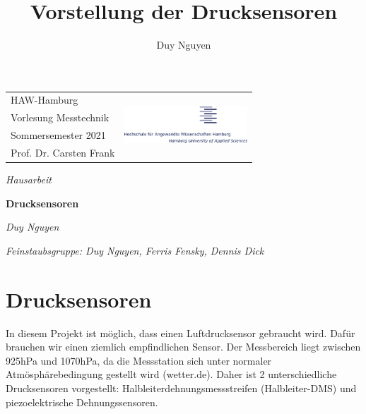 \documentclass[12pt]{article}
\title{Vorstellung der Drucksensoren}
\author{Duy Nguyen}
\begin{document}
\pagestyle{empty}
\color{smokyblack}

\setlength{\parskip}{1ex}
\begin{table}[t]
  \begin{center}
    \begin{tabular}{p{}r}
      \small{HAW-Hamburg} & \multirow{4}{*}{\includegraphics[width=4.6cm]{haw-logo}} \\
      \small{Vorlesung Messtechnik} &  \\
      \small{Sommersemester 2021} & \\
      \small{Prof. Dr. Carsten Frank} & 
    \end{tabular} 
  \end{center}
\end{table}

\vspace{2cm}

\textsf{\textit{\Large{Hausarbeit}}}

\color{arsenic}
\textsf{\textbf{\huge{Drucksensoren}}}
\setlength{\parskip}{0.8em}
\color{smokyblack}

\begin{adjustwidth}{3em}{0pt}
\begin{flushleft}
	\textit{Duy Nguyen} 

  \vspace{-12pt}

  \textit{\footnotesize{Feinstaubsgruppe: Duy Nguyen, Ferris Fensky, Dennis Dick}}
\end{flushleft}
\end{adjustwidth}

\tableofcontents
\newpage
\listoffigures
{}
\listoftables
{}


\newpage
\pagestyle{fancy}
\section{Drucksensoren}
\label{sec:drucksensoren}
In diesem Projekt ist möglich, dass einen Luftdrucksensor gebraucht wird. Dafür brauchen wir einen ziemlich empfindlichen Sensor. Der Messbereich liegt zwischen 925hPa und 1070hPa, da die Messstation sich unter normaler Atmösphärebedingung gestellt wird (wetter.de). Daher ist 2 unterschiedliche Drucksensoren vorgestellt: Halbleiterdehnungsmessstreifen (Halbleiter-DMS) und piezoelektrische Dehnungssensoren. 
\end{document}
